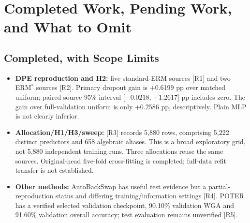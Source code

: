 \documentclass[runningheads]{llncs}
\newcommand{\status}[1]{\textbf{#1}}
\begin{document}
\section{Completed Work, Pending Work, and What to Omit}
\subsection{Completed, with Scope Limits}
\begin{itemize}
\item \status{DPE reproduction and H2:} five standard-ERM sources [R1] and two ERM$^*$ sources [R2]. Primary dropout gain is +0.6199 pp over matched uniform; paired source 95\% interval [$-0.0218$, +1.2617] pp includes zero. The gain over full-validation uniform is only +0.2586 pp, descriptively. Plain MLP is not clearly inferior.
\item \status{Allocation/H1/H3/sweep:} [R3] records 5,880 rows, comprising 5,222 distinct predictors and 658 algebraic aliases. This is a broad exploratory grid, not 5,880 independent training runs. Three allocations reuse the same sources. Original-head five-fold cross-fitting is completed; full-data refit transfer is not established.
\item \status{Other methods:} AutoBackSwap has useful test evidence but a partial-reproduction status and differing training/information settings [R4]. POTER has a verified selected validation checkpoint, 90.10\% validation WGA and 91.60\% validation overall accuracy; test evaluation remains unverified [R5].
\end{itemize}
\end{document}
